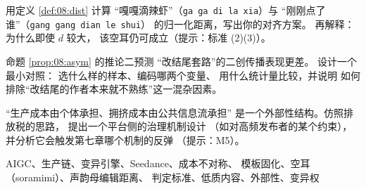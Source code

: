 \begin{nlexercises}
  \item 用定义 \ref{def:08:dist} 计算
        “嘎嘎滴辣虾”（\texttt{ga ga di la xia}）与
        “刚刚点了谁”（\texttt{gang gang dian le shui}）
        的归一化距离，写出你的对齐方案。
        再解释：为什么即使 $d$ 较大，
        该空耳仍可成立（提示：标准 (2)(3)）。
  \item 命题 \ref{prop:08:asym} 的推论二预测
        “改结尾套路”的二创传播表现更差。
        设计一个最小对照：
        选什么样的样本、编码哪两个变量、
        用什么统计量比较，并说明
        如何排除“改结尾的作者本来就不熟练”这一混杂因素。
  \item “生产成本由个体承担、拥挤成本由公共信息流承担”
        是一个外部性结构。仿照排放税的思路，
        提出一个平台侧的治理机制设计
        （如对高频发布者的某个约束），
        并分析它会触发第七章哪个机制的反弹
        （提示：M5）。
\end{nlexercises}

\nlkeywords AIGC、生产链、变异引擎、Seedance、成本不对称、
模板固化、空耳（soramimi）、声韵母编辑距离、
判定标准、低质内容、外部性、变异权
